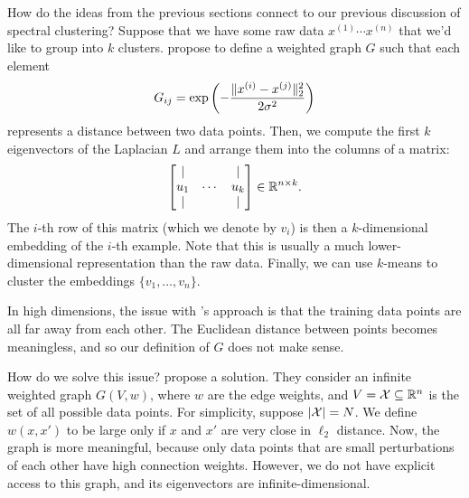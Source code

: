 How do the ideas from the previous sections connect to our previous discussion of spectral clustering? Suppose that we have some raw data $x^{(1)} \cdots x^{(n)}$ that we'd like to group into $k$ clusters. \citet{ng2001spectral} propose to define a weighted graph $G$ such that each element 
\begin{equation}
    G_{ij} = \exp \left( -\frac{\|x^{(i)} - x^{(j)}\|^2_2}{2\sigma^2} \right)
\end{equation}
represents a distance between two data points. Then, we compute the first $k$ eigenvectors of the Laplacian $L$ and arrange them into the columns of a matrix: 
\begin{equation}
    \begin{bmatrix} \lvert &  & \lvert \\ u_1 & \cdots &  u_k \\ \lvert &  & \lvert \end{bmatrix} \in \mathbb R^{n \times k}.
\end{equation} 
The $i$-th row of this matrix (which we denote by $v_i$) is then a $k$-dimensional embedding of the $i$-th example. Note that this is usually a much lower-dimensional representation than the raw data. Finally, we can use $k$-means to cluster the embeddings $\{v_1,\dots,v_n\}$.

In high dimensions, the issue with \citet{ng2001spectral}'s approach is that the training data points are all far away from each other. The Euclidean distance between points becomes meaningless, and so our definition of $G$ does not make sense. 

How do we solve this issue? \citet{haochen2021provable} propose a solution. They consider an infinite weighted graph $G(V, w)$, where $w$ are the edge weights, and $V = \mathcal X \subseteq \mathbb R^n$ is the set of all possible data points. For simplicity, suppose $| \mathcal X | = N$. We define $w(x, x')$ to be large only if $x$ and $x'$ are very close in $\ell_2$ distance. Now, the graph is more meaningful, because only data points that are small perturbations of each other have high connection weights. However, we do not have explicit access to this graph, and its eigenvectors are infinite-dimensional. 

